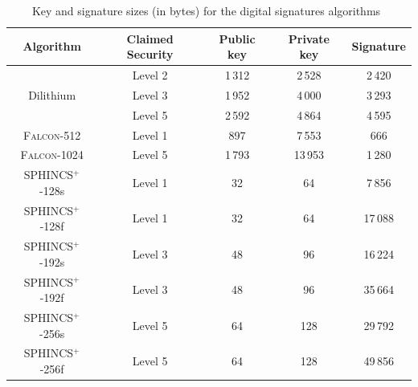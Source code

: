 \begin{table}[h]
    \centering
    \begin{tabular}[p]{| c | c | c | c | c |}
        \hline
        \textbf{Algorithm} & \textbf{Claimed Security} & \textbf{Public key} & \textbf{Private key} & \textbf{Signature} \\ \hline
        \multirow{3}{*}{Dilithium} & Level 2 & 1\,312 & 2\,528 & 2\,420 \\
        & Level 3 & 1\,952 & 4\,000 & 3\,293 \\
        & Level 5 & 2\,592 & 4\,864 & 4\,595 \\
        \hline
        \textsc{Falcon}-512 & Level 1 & 897 & 7\,553 & 666 \\
        \textsc{Falcon}-1024 & Level 5 & 1\,793 & 13\,953 & 1\,280 \\
        \hline
        SPHINCS$^+$-128s & Level 1 & 32 & 64 & 7\,856 \\
        SPHINCS$^+$-128f & Level 1 & 32 & 64 & 17\,088 \\
        SPHINCS$^+$-192s & Level 3 & 48 & 96 & 16\,224 \\
        SPHINCS$^+$-192f & Level 3 & 48 & 96 & 35\,664 \\
        SPHINCS$^+$-256s & Level 5 & 64 & 128 & 29\,792 \\
        SPHINCS$^+$-256f & Level 5 & 64 & 128 & 49\,856 \\
        \hline
    \end{tabular}
    \caption{Key and signature sizes (in bytes) for the digital signatures algorithms~\cite{NIST.round3.report}}
    \label{tab:signature.sizes}
\end{table}


